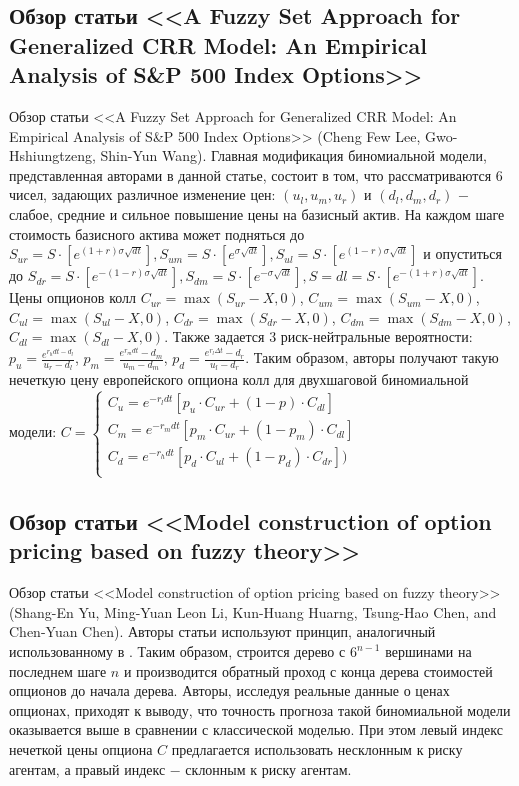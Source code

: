 \documentclass[a4paper, 12pt]{extarticle}
\begin{document}
	\subsection{Обзор статьи <<A Fuzzy Set Approach for Generalized CRR Model: An Empirical Analysis of S\&P 500 Index Options>>}
	Обзор статьи <<A Fuzzy Set Approach for Generalized CRR Model: An Empirical Analysis of S\&P 500 Index Options>> \cite{3} (Cheng Few Lee, Gwo-Hshiungtzeng, Shin-Yun Wang). Главная модификация биномиальной модели, представленная авторами в данной статье, состоит в том, что рассматриваются 6 чисел, задающих различное изменение цен: $(u_l, u_m, u_r)$ и $(d_l, d_m, d_r)$ $-$ слабое, средние и сильное повышение цены на базисный актив. На каждом шаге стоимость базисного актива может подняться до $S_{ur}=S\cdot[e^{(1+r)\sigma \sqrt{dt}}],S_{um}=S\cdot[e^{\sigma \sqrt{dt}}],S_{ul}=S\cdot[e^{(1-r)\sigma \sqrt{dt}}]$ и опуститься до $S_{dr}=S\cdot[e^{-(1-r)\sigma \sqrt{dt}}],S_{dm}=S\cdot[e^{-\sigma \sqrt{dt}}],S={dl}=S\cdot[e^{-(1+r)\sigma \sqrt{dt}}]$. Цены опционов колл $C_{ur} = \max(S_{ur} - X,0)$, $C_{um} = \max(S_{um} - X,0)$, $C_{ul} =
	\max(S_{ul} - X,0)$, $C_{dr} = \max(S_{dr} - X,0)$, $C_{dm} = \max(S_{dm} - X,0)$, $C_{dl} = \max(S_{dl} - X,0)$. Также задается $3$ риск-нейтральные вероятности: $p_{u}=\frac{e^{r_h dt - d_l}}{u_r-d_l}$, $p_m=\frac{e^{r_m dt}-d_m}{u_m-d_m}$, $p_d=\frac{e^{r_l\Delta t}-d_r}{u_l-d_r}$. Таким образом, авторы получают такую нечеткую цену европейского опциона колл для двухшаговой биномиальной модели: $C=\begin{cases} C_u=e^{-r_l dt}[p_u\cdot C_{ur}+(1-p)\cdot C_{dl}] \\ C_m=e^{-r_m dt}[p_m\cdot C_{ur}+(1-p_m)\cdot C_{dl}] \\ C_d=e^{-r_h dt}[p_d\cdot C_{ul} + (1-p_d)\cdot C_{dr}]) \\ \end{cases}$
	
	\subsection{Обзор статьи <<Model construction of option pricing based on fuzzy theory>>}
	Обзор статьи <<Model construction of option pricing based on fuzzy theory>> \cite{2} (Shang-En Yu, Ming-Yuan Leon Li, Kun-Huang Huarng, Tsung-Hao Chen, and Chen-Yuan Chen). Авторы статьи используют принцип, аналогичный использованному в \cite{3}. Таким образом, строится дерево с $6^{n-1}$ вершинами на последнем шаге $n$ и производится обратный проход с конца дерева стоимостей опционов до начала дерева. Авторы, исследуя реальные данные о ценах опционах, приходят к выводу, что точность прогноза такой биномиальной модели оказывается выше в сравнении с классической моделью. При этом левый индекс нечеткой цены опциона $C$ предлагается использовать несклонным к риску агентам, а правый индекс $-$ склонным к риску агентам.
	
\end{document}
